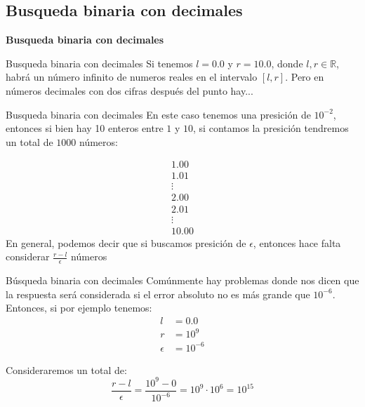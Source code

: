 
\subsection{Busqueda binaria con decimales}

\begin{frame}[plain]
	\centering
	\color{theme-brand-color}
	\Huge \textbf{Busqueda binaria con decimales}
\end{frame}

\begin{frame}{Busqueda binaria con decimales}
	Si tenemos \(l = 0.0\) y \(r = 10.0\), donde \(l, r \in \mathbb{R}\), habrá un número infinito de
	numeros reales en el intervalo \([l, r]\). Pero en números decimales con dos cifras después del punto hay...
\end{frame}

\begin{frame}{Busqueda binaria con decimales}
	En este caso tenemos una presición de $10^{-2}$, entonces si bien hay 10 enteros entre $1$ y $10$, si contamos la presición tendremos un total de $1000$ números:

	\begin{align*}
		1.00   \\
		1.01   \\
		\vdots \\
		2.00   \\
		2.01   \\
		\vdots \\
		10.00
	\end{align*}
	En general, podemos decir que si buscamos presición de $\epsilon$, entonces hace falta considerar $\frac{r - l}{\epsilon}$ números
\end{frame}

\begin{frame}{Búsqueda binaria con decimales}
	Comúnmente hay problemas donde nos dicen que la respuesta será considerada si el error absoluto no es más grande que $10^{-6}$. Entonces, si por ejemplo tenemos:
	\[
		\begin{aligned}
			l        & = 0.0     \\
			r        & = 10^{9}  \\
			\epsilon & = 10^{-6}
		\end{aligned}
	\]

	Consideraremos un total de:
	\[
		\dfrac{r - l}{\epsilon} = \dfrac{10^{9} - 0}{10^{-6}} = 10^{9} \cdot 10^{6} = 10^{15}
	\]
\end{frame}

